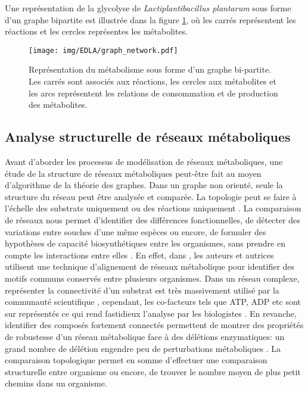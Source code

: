 \documentclass[../main.tex]{subfiles}
\begin{document}
Une représentation de la glycolyse de \textit{Lactiplantibacillus plantarum} sous forme d'un graphe bipartite est illustrée dans la figure \ref{fig:graph-network}, où les carrés représentent les réactions et les cercles représentes les métabolites.


\begin{figure}[h!]
    \centering
    \texttt{[image: img/EDLA/graph\_network.pdf]}
    \caption{Représentation du métabolisme sous forme d'un graphe bi-partite. Les carrés sont associés aux réactions, les cercles aux métabolites et les arcs représentent les relations de consommation et de production des métabolites.}
    \label{fig:graph-network}
\end{figure}


\subsection{Analyse structurelle de réseaux métaboliques}
Avant d'aborder les processus de modélisation de réseaux métaboliques, une étude de la structure de réseaux métaboliques peut-être fait au moyen d'algorithme de la théorie des graphes. Dans un graphe non orienté, seule la structure du réseau peut être analysée et comparée. La topologie peut se faire à l'échelle des substrats uniquement \citep{Jeong2011} ou des réactions uniquement \citep{Wagner2001}. La comparaison de réseaux nous permet d'identifier des différences fonctionnelles, de détecter des variations entre souches d'une même espèces ou encore, de formuler des hypothèses de capacité biosynthétiques entre les organismes, sans prendre en compte les interactions entre elles \citep{Biggs2015}. En effet, dans \citep{Ay2012}, les auteurs et autrices utilisent une technique d'alignement de réseaux métabolique pour identifier des motifs communs conservés entre plusieurs organismes. Dans un réseau complexe, représenter la connectivité d'un substrat est très massivement utilisé par la communauté scientifique \citep{Ma2003}, cependant, les co-facteurs tels que ATP, ADP etc sont sur représentés ce qui rend fastidieux l'analyse par les biologistes \citep{Sweetlove2005}. En revanche, identifier des composés fortement connectés permettent de montrer des propriétés de robustesse d'un réseau métabolique face à des délétions enzymatiques: un grand nombre de délétion engendre peu de perturbations métaboliques  \citep{Lemke2004}. La comparaison topologique permet en somme d'effectuer une comparaison structurelle entre organisme \citep{Ma2003} ou encore, de trouver le nombre moyen de plus petit chemins\citep{Wagner2001} dans un organisme.\\ 
\end{document}
